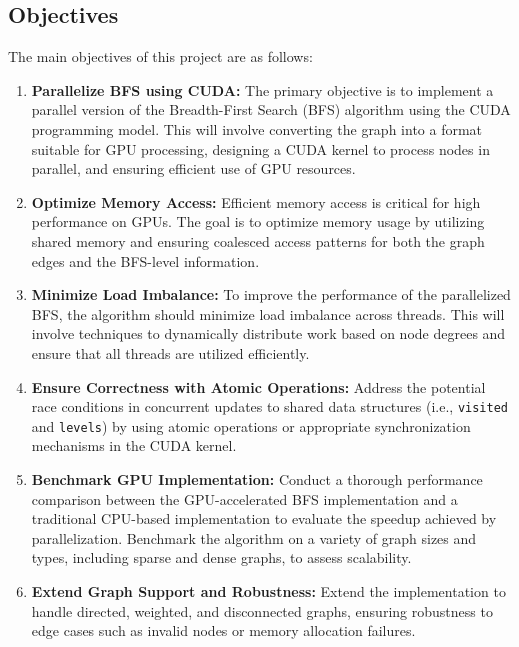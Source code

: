 \documentclass[a4paper,12pt]{article}
\begin{document}
\begin{center}
\section*{Objectives}

The main objectives of this project are as follows:

\begin{enumerate}
    \item \textbf{Parallelize BFS using CUDA:} The primary objective is to implement a parallel version of the Breadth-First Search (BFS) algorithm using the CUDA programming model. This will involve converting the graph into a format suitable for GPU processing, designing a CUDA kernel to process nodes in parallel, and ensuring efficient use of GPU resources.
    
    \item \textbf{Optimize Memory Access:} Efficient memory access is critical for high performance on GPUs. The goal is to optimize memory usage by utilizing shared memory and ensuring coalesced access patterns for both the graph edges and the BFS-level information. 

    \item \textbf{Minimize Load Imbalance:} To improve the performance of the parallelized BFS, the algorithm should minimize load imbalance across threads. This will involve techniques to dynamically distribute work based on node degrees and ensure that all threads are utilized efficiently.
    
    \item \textbf{Ensure Correctness with Atomic Operations:} Address the potential race conditions in concurrent updates to shared data structures (i.e., \texttt{visited} and \texttt{levels}) by using atomic operations or appropriate synchronization mechanisms in the CUDA kernel.
    
    \item \textbf{Benchmark GPU Implementation:} Conduct a thorough performance comparison between the GPU-accelerated BFS implementation and a traditional CPU-based implementation to evaluate the speedup achieved by parallelization. Benchmark the algorithm on a variety of graph sizes and types, including sparse and dense graphs, to assess scalability.
    
    \item \textbf{Extend Graph Support and Robustness:} Extend the implementation to handle directed, weighted, and disconnected graphs, ensuring robustness to edge cases such as invalid nodes or memory allocation failures.
    

\end{enumerate}
\end{center}
\end{document}
